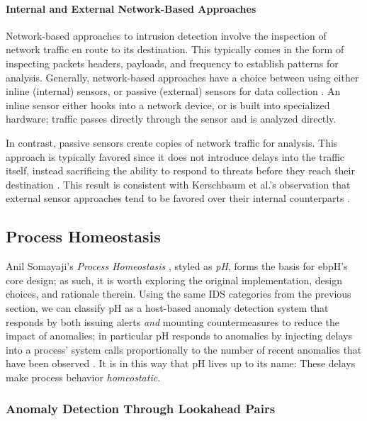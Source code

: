 \documentclass[
  12pt]{findlay}
\begin{document}
\hypertarget{internal-and-external-network-based-approaches}{%
\paragraph{Internal and External Network-Based
Approaches}\label{internal-and-external-network-based-approaches}}

Network-based approaches \autocite{stallings07} to intrusion detection
involve the inspection of network traffic en route to its destination.
This typically comes in the form of inspecting packets headers,
payloads, and frequency to establish patterns for analysis. Generally,
network-based approaches have a choice between using either inline
(internal) sensors, or passive (external) sensors for data collection
\autocite{stallings07}. An inline sensor either hooks into a network
device, or is built into specialized hardware; traffic passes directly
through the sensor and is analyzed directly.

In contrast, passive sensors create copies of network traffic for
analysis. This approach is typically favored since it does not introduce
delays into the traffic itself, instead sacrificing the ability to
respond to threats before they reach their destination
\autocite{stallings07}. This result is consistent with Kerschbaum et
al.'s observation that external sensor approaches tend to be favored
over their internal counterparts \autocite{spafford02}.

\hypertarget{process-homeostasis}{%
\subsection{Process Homeostasis}\label{process-homeostasis}}

Anil Somayaji's \emph{Process Homeostasis} \autocite{soma02}, styled as
\emph{pH}, forms the basis for ebpH's core design; as such, it is worth
exploring the original implementation, design choices, and rationale
therein. Using the same IDS categories from the previous section, we can
classify pH as a host-based anomaly detection system that responds by
both issuing alerts \emph{and} mounting countermeasures to reduce the
impact of anomalies; in particular pH responds to anomalies by injecting
delays into a process' system calls proportionally to the number of
recent anomalies that have been observed \autocite{soma02}. It is in
this way that pH lives up to its name: These delays make process
behavior \emph{homeostatic}.

\hypertarget{anomaly-detection-through-lookahead-pairs}{%
\subsubsection{Anomaly Detection Through Lookahead
Pairs}\label{anomaly-detection-through-lookahead-pairs}}
\end{document}
